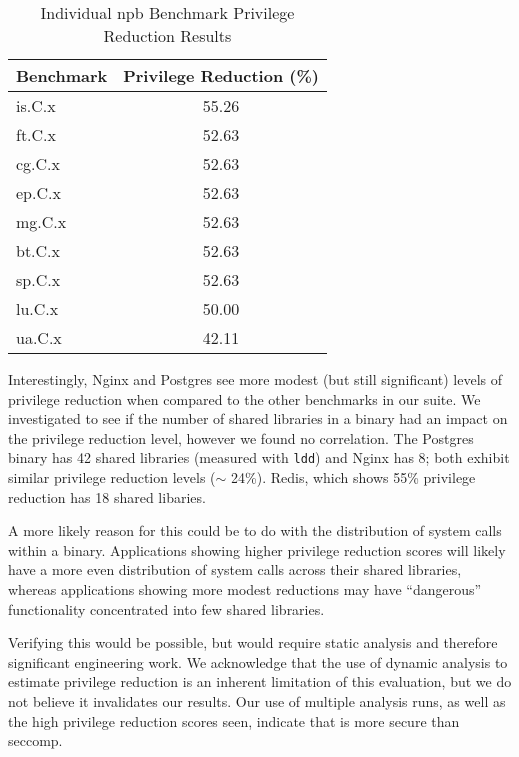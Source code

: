 \begin{table}[ht]
  \centering
  \caption{Individual \ac{npb} Benchmark Privilege Reduction Results}
  \label{tab:npb_individual_sorted}
  \begin{tabular}{l S[table-format=2.2]}
    \toprule
    Benchmark & {Privilege Reduction (\%)} \\ %
    \midrule
    is.C.x    & 55.26 \\ 
    ft.C.x    & 52.63 \\
    cg.C.x    & 52.63 \\
    ep.C.x    & 52.63 \\
    mg.C.x    & 52.63 \\
    bt.C.x    & 52.63 \\
    sp.C.x    & 52.63 \\
    lu.C.x    & 50.00 \\
    ua.C.x    & 42.11 \\ 
    \bottomrule
  \end{tabular}
\end{table}

Interestingly, Nginx and Postgres see more modest (but still significant) levels
of privilege reduction when compared to the other benchmarks in our suite. We
investigated to see if the number of shared libraries in a binary had an impact
on the privilege reduction level, however we found no correlation. The Postgres
binary has 42 shared libraries (measured with \texttt{ldd}) and Nginx has 8; 
both exhibit similar privilege reduction levels ($\sim$ 24\%). Redis, which
shows 55\% privilege reduction has 18 shared libaries. 

A more likely reason for this could be to do with the distribution of system
calls within a binary. Applications showing higher privilege reduction scores
will likely have a more even distribution of system calls across their shared
libraries, whereas applications showing more modest reductions may have
``dangerous'' functionality concentrated into few shared libraries.

Verifying this would be possible, but would require static analysis and
therefore significant engineering work. We acknowledge that the use of dynamic
analysis to estimate privilege reduction is an inherent limitation of this
evaluation, but we do not believe it invalidates our results. Our use of
multiple analysis runs, as well as the high privilege reduction scores seen,
indicate that \af is more secure than seccomp. 

